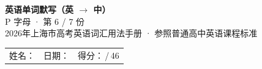 \documentclass[10pt,a4paper]{article}
\begin{document}
\pagestyle{plain}

\begin{center}
{\LARGE\bfseries 英语单词默写（英 $\to$ 中）}\\[0.22em]
{\large P 字母 · 第 6 / 7 份}\\[0.18em]
{\small 2026年上海市高考英语词汇用法手册 · 参照普通高中英语课程标准}
\end{center}

\vspace{0.25em}
\noindent\begin{tabular}{@{}p{}@{}p{}@{}p{}@{}}
姓名：\underline{\hspace{2.0cm}} & 日期：\underline{\hspace{2.0cm}} & 得分：\underline{\hspace{1.3cm}}\,/\,46 \\
\end{tabular}

\vspace{0.3em}

\vspace{0.08em}
\end{document}
